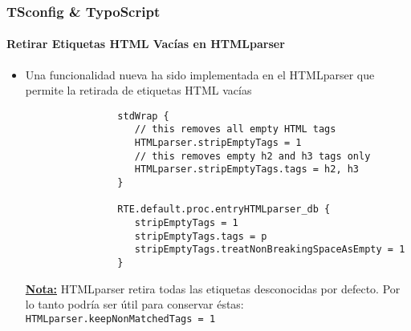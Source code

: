 \begin{frame}[fragile]
	\frametitle{TSconfig \& TypoScript}
	\framesubtitle{Retirar Etiquetas HTML Vacías en HTMLparser}

	\lstset{basicstyle=\tiny\ttfamily}

	\begin{itemize}
		\item Una funcionalidad nueva ha sido implementada en el HTMLparser
			que permite la retirada de etiquetas HTML vacías

			\begin{lstlisting}
				stdWrap {
				   // this removes all empty HTML tags
				   HTMLparser.stripEmptyTags = 1
				   // this removes empty h2 and h3 tags only
				   HTMLparser.stripEmptyTags.tags = h2, h3
				}

				RTE.default.proc.entryHTMLparser_db {
				   stripEmptyTags = 1
				   stripEmptyTags.tags = p
				   stripEmptyTags.treatNonBreakingSpaceAsEmpty = 1
				}
			\end{lstlisting}

			\underline{\textbf{Nota:}}
				HTMLparser retira todas las etiquetas desconocidas por defecto.\newline
				Por lo tanto podría ser útil para conservar éstas:\newline
				\texttt{HTMLparser.keepNonMatchedTags = 1}

	\end{itemize}

\end{frame}

